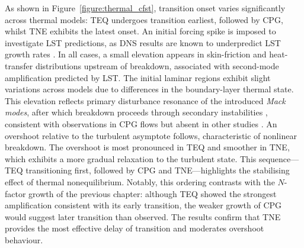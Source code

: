 

As shown in Figure~\ref{figure:thermal_cfst}, transition onset varies significantly across thermal models: \gls{TEQ} undergoes transition earliest, followed by \gls{CPG}, whilst \gls{TNE} exhibits the latest onset. An initial forcing spike is imposed to investigate \gls{LST} predictions, as \gls{DNS} results are known to underpredict \gls{LST} growth rates \citep{Stemmer2005}. In all cases, a small elevation appears in skin-friction and heat-transfer distributions upstream of breakdown, associated with second-mode amplification predicted by \gls{LST}. The initial laminar regions exhibit slight variations across models due to differences in the boundary-layer thermal state. This elevation reflects primary disturbance resonance of the introduced \textit{Mack modes}, after which breakdown proceeds through secondary instabilities \citep{DiRenzo2021}, consistent with observations in \gls{CPG} flows \citep{Franko2013} but absent in other studies \citep{Passiatoreetal2021,Williamsetal2025}. An overshoot relative to the turbulent asymptote follows, characteristic of nonlinear breakdown. The overshoot is most pronounced in \gls{TEQ} and smoother in \gls{TNE}, which exhibits a more gradual relaxation to the turbulent state. This sequence—\gls{TEQ} transitioning first, followed by \gls{CPG} and \gls{TNE}—highlights the stabilising effect of thermal nonequilibrium. Notably, this ordering contrasts with the $N$-factor growth of the previous chapter: although \gls{TEQ} showed the strongest amplification consistent with its early transition, the weaker growth of \gls{CPG} would suggest later transition than observed. The results confirm that \gls{TNE} provides the most effective delay of transition and moderates overshoot behaviour.



